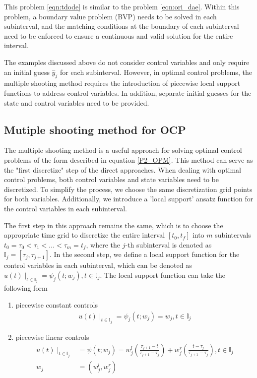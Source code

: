 \documentclass  [
  paper    = a4,
  BCOR     = 10mm,
  twoside,
  fontsize = 12pt,
  fleqn,
  toc      = bibnumbered,
  toc      = listofnumbered,
  numbers  = noendperiod,
  headings = normal,
  listof   = leveldown,
  version  = 3.03
]                                       {scrreprt}
\newcommand{\<}{\langle}
\renewcommand{\>}{\rangle}
\begin{document}
This problem \ref{eqn:tdode}  is similar to the problem \ref{eqn:ori_dae}. Within this problem, a boundary value problem (BVP) needs to be solved in each subinterval, and the matching conditions at the boundary of each subinterval need to be enforced to ensure a continuous and valid solution for the entire interval.

The examples discussed above do not consider control variables and only require an initial guess $\hat{y}_j$ for each subinterval. However, in optimal control problems, the multiple shooting method requires the introduction of piecewise local support functions to address control variables. In addition, separate initial guesses for the state and control variables need to be provided.



\subsection{Mutiple shooting method for OCP}
\label{Sec_MS_OCP}

The multiple shooting method is a useful approach for solving optimal control problems of the form described in equation \ref{P2_OPM}. This method can serve as the "first discretize" step of the direct approaches. When dealing with optimal control problems, both control variables and state variables need to be discretized. To simplify the process, we choose the same discretization grid points for both variables. Additionally, we introduce a 'local support' ansatz function for the control variables in each subinterval.

The first step in this approach remains the same, which is to choose the appropriate time grid to discretize the entire interval $[t_0, t_f]$ into $m$ subintervals $t_0 = \tau_0 < \tau_1 < ... < \tau_m = t_f$, where the $j$-th subinterval is denoted as $\mathbb{I}_j = [\tau_j, \tau_{j+1}]$. In the second step, we define a local support function for the control variables in each subinterval, which can be denoted as $u(t) \mid_{t \in \mathbb{I}_j} = \psi_j(t;w_j), t \in \mathbb{I}_j$. The local support function can take the following form


\begin{enumerate}
	\item piecewise constant controls
	\begin{align}
	 u(t) \mid_{t \in \mathbb{I}_j} = \psi_j(t;w_j)= w_j, t \in \mathbb{I}_j
	 \end{align}
	\item piecewise linear controls
		\begin{align}
		u(t) \mid_{t \in \mathbb{I}_j} &= \psi(t;w_j)= w_j^l (\frac{\tau_{j+1} -t }{\tau_{j+1} - \tau_j}) + w_j^r (\frac{t- \tau_j}{\tau_{j+1} - \tau_j}) , t \in \mathbb{I}_j \\
		w_j &= (w_j^l, w_j^r)
	\end{align} 
\end{enumerate}
\end{document}
